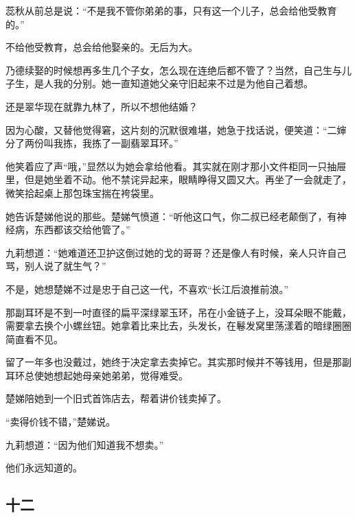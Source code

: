 \par 蕊秋从前总是说：“不是我不管你弟弟的事，只有这一个儿子，总会给他受教育的。”
\par 不给他受教育，总会给他娶亲的。无后为大。
\par 乃德续娶的时候想再多生几个子女，怎么现在连绝后都不管了？当然，自己生与儿子生，是人我的分别。她一直知道她父亲守旧起来不过是为他自己着想。
\par 还是翠华现在就靠九林了，所以不想他结婚？
\par 因为心酸，又替他觉得窘，这片刻的沉默很难堪，她急于找话说，便笑道：“二婶分了两份叫我拣，我拣了一副翡翠耳环。”
\par 他笑着应了声“哦，”显然以为她会拿给他看。其实就在刚才那小文件柜同一只抽屉里，但是她坐着不动。他不禁诧异起来，眼睛睁得又圆又大。再坐了一会就走了，微笑拾起桌上那包珠宝揣在袴袋里。
\par 她告诉楚娣他说的那些。楚娣气愤道：“听他这口气，你二叔已经老颠倒了，有神经病，东西都该交给他管了。”
\par 九莉想道：“她难道还卫护这倒过她的戈的哥哥？还是像人有时候，亲人只许自己骂，别人说了就生气？”
\par 不是，她想楚娣不过是忠于自己这一代，不喜欢“长江后浪推前浪。”
\par 那副耳环是不到一吋直径的扁平深绿翠玉环，吊在小金链子上，没耳朵眼不能戴，需要拿去换个小螺丝钮。她拿着比来比去，头发长，在鬈发窝里荡漾着的暗绿圈圈简直看不见。
\par 留了一年多也没戴过，她终于决定拿去卖掉它。其实那时候并不等钱用，但是那副耳环总使她想起她母亲她弟弟，觉得难受。
\par 楚娣陪她到一个旧式首饰店去，帮着讲价钱卖掉了。
\par “卖得价钱不错，”楚娣说。
\par 九莉想道：“因为他们知道我不想卖。”
\par 他们永远知道的。

\subsection{十二}


